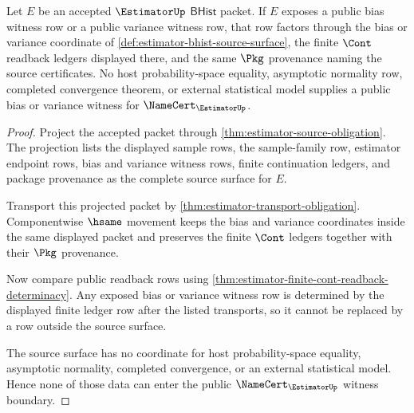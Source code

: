 \begin{theorem}
\label{thm:estimator-bias-variance-ledger-exclusion}
Let $E$ be an accepted $\EstimatorUp$ $\mathsf{BHist}$ packet. If $E$ exposes
a public bias witness row or a public variance witness row, that row factors
through the bias or variance coordinate of
\autoref{def:estimator-bhist-source-surface}, the finite $\Cont$ readback
ledgers displayed there, and the same $\Pkg$ provenance naming the source
certificates. No host probability-space equality, asymptotic normality row,
completed convergence theorem, or external statistical model supplies a
public bias or variance witness for $\NameCert_{\EstimatorUp}$.
\end{theorem}
\begin{proof}
Project the accepted packet through
\autoref{thm:estimator-source-obligation}. The projection lists the displayed
sample rows, the sample-family row, estimator endpoint rows, bias and
variance witness rows, finite continuation ledgers, and package provenance as
the complete source surface for $E$.

Transport this projected packet by
\autoref{thm:estimator-transport-obligation}. Componentwise $\hsame$ movement
keeps the bias and variance coordinates inside the same displayed packet and
preserves the finite $\Cont$ ledgers together with their $\Pkg$ provenance.

Now compare public readback rows using
\autoref{thm:estimator-finite-cont-readback-determinacy}. Any exposed bias or
variance witness row is determined by the displayed finite ledger row after
the listed transports, so it cannot be replaced by a row outside the source
surface.

The source surface has no coordinate for host probability-space equality,
asymptotic normality, completed convergence, or an external statistical
model. Hence none of those data can enter the public
$\NameCert_{\EstimatorUp}$ witness boundary.
\end{proof}

